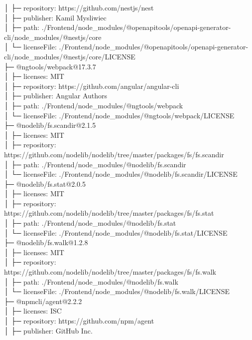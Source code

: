 │  ├─ repository: https://github.com/nestjs/nest\\
│  ├─ publisher: Kamil Mysliwiec\\
│  ├─ path: ./Frontend/node\_modules/@openapitools/openapi-generator-cli/node\_modules/@nestjs/core\\
│  └─ licenseFile: ./Frontend/node\_modules/@openapitools/openapi-generator-cli/node\_modules/@nestjs/core/LICENSE\\
├─ @ngtools/webpack@17.3.7\\
│  ├─ licenses: MIT\\
│  ├─ repository: https://github.com/angular/angular-cli\\
│  ├─ publisher: Angular Authors\\
│  ├─ path: ./Frontend/node\_modules/@ngtools/webpack\\
│  └─ licenseFile: ./Frontend/node\_modules/@ngtools/webpack/LICENSE\\
├─ @nodelib/fs.scandir@2.1.5\\
│  ├─ licenses: MIT\\
│  ├─ repository: https://github.com/nodelib/nodelib/tree/master/packages/fs/fs.scandir\\
│  ├─ path: ./Frontend/node\_modules/@nodelib/fs.scandir\\
│  └─ licenseFile: ./Frontend/node\_modules/@nodelib/fs.scandir/LICENSE\\
├─ @nodelib/fs.stat@2.0.5\\
│  ├─ licenses: MIT\\
│  ├─ repository: https://github.com/nodelib/nodelib/tree/master/packages/fs/fs.stat\\
│  ├─ path: ./Frontend/node\_modules/@nodelib/fs.stat\\
│  └─ licenseFile: ./Frontend/node\_modules/@nodelib/fs.stat/LICENSE\\
├─ @nodelib/fs.walk@1.2.8\\
│  ├─ licenses: MIT\\
│  ├─ repository: https://github.com/nodelib/nodelib/tree/master/packages/fs/fs.walk\\
│  ├─ path: ./Frontend/node\_modules/@nodelib/fs.walk\\
│  └─ licenseFile: ./Frontend/node\_modules/@nodelib/fs.walk/LICENSE\\
├─ @npmcli/agent@2.2.2\\
│  ├─ licenses: ISC\\
│  ├─ repository: https://github.com/npm/agent\\
│  ├─ publisher: GitHub Inc.\\
